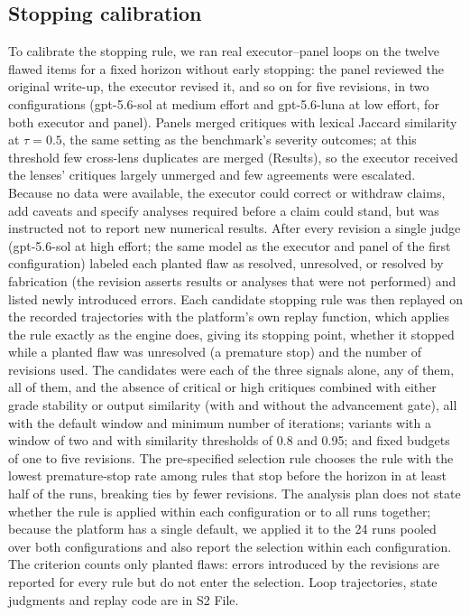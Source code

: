 \documentclass[10pt,letterpaper]{article}
\begin{document}
\subsection*{Stopping calibration}

To calibrate the stopping rule, we ran real executor--panel loops on the twelve flawed items for a fixed horizon without early stopping: the panel reviewed the original write-up, the executor revised it, and so on for five revisions, in two configurations (gpt-5.6-sol at medium effort and gpt-5.6-luna at low effort, for both executor and panel). Panels merged critiques with lexical Jaccard similarity at $\tau=0.5$, the same setting as the benchmark's severity outcomes; at this threshold few cross-lens duplicates are merged (Results), so the executor received the lenses' critiques largely unmerged and few agreements were escalated. Because no data were available, the executor could correct or withdraw claims, add caveats and specify analyses required before a claim could stand, but was instructed not to report new numerical results. After every revision a single judge (gpt-5.6-sol at high effort; the same model as the executor and panel of the first configuration) labeled each planted flaw as resolved, unresolved, or resolved by fabrication (the revision asserts results or analyses that were not performed) and listed newly introduced errors. Each candidate stopping rule was then replayed on the recorded trajectories with the platform's own replay function, which applies the rule exactly as the engine does, giving its stopping point, whether it stopped while a planted flaw was unresolved (a premature stop) and the number of revisions used. The candidates were each of the three signals alone, any of them, all of them, and the absence of critical or high critiques combined with either grade stability or output similarity (with and without the advancement gate), all with the default window and minimum number of iterations; variants with a window of two and with similarity thresholds of 0.8 and 0.95; and fixed budgets of one to five revisions. The pre-specified selection rule chooses the rule with the lowest premature-stop rate among rules that stop before the horizon in at least half of the runs, breaking ties by fewer revisions. The analysis plan does not state whether the rule is applied within each configuration or to all runs together; because the platform has a single default, we applied it to the 24 runs pooled over both configurations and also report the selection within each configuration. The criterion counts only planted flaws: errors introduced by the revisions are reported for every rule but do not enter the selection. Loop trajectories, state judgments and replay code are in S2 File.
\end{document}
